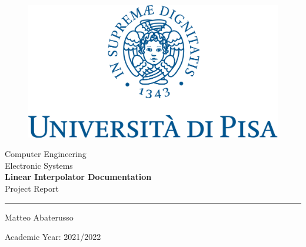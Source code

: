 \begin{titlepage}
	\begin{center}
		\begin{figure}
			\includegraphics[width=\textwidth]{img/Logo.png}         
		\end{figure}
		{\Large
			Computer Engineering\\
			\vspace{5mm} %
			Electronic Systems}\\
		\vspace{30mm} %
		{\Huge\textbf{Linear Interpolator Documentation}}\\
		\vspace{10mm} %
		{\Large Project Report}\\
		\par\noindent\rule{\textwidth}{0.4pt}
		\begin{flushright}
			Matteo Abaterusso\\
			
		\end{flushright}
		\vfill
		Academic Year: 2021/2022\\        
	\end{center}
\end{titlepage} 